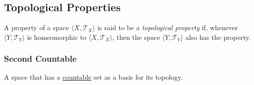 \subsection{Topological Properties}\label{topologicalproperties}
A property of a space $\langle X,\mathcal{T}_X \rangle$ is said to be a \emph{topological property} if, whenever $\langle Y, \mathcal{T}_Y \rangle$ is homeomorphic to $\langle X,\mathcal{T}_X \rangle$, then the space $\langle Y,\mathcal{T}_Y \rangle$
also has the property.

\subsubsection{Second Countable}\label{secondcountable}
A space that has a \hyperref[countable]{countable} set as a basis for its topology.